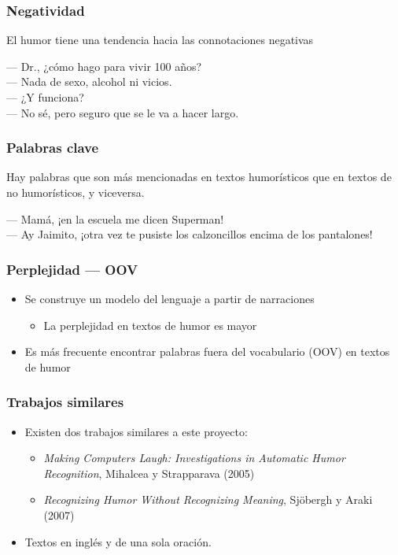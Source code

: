 \begin{frame}
    \frametitle{Negatividad}
    
    El humor tiene una tendencia hacia las connotaciones negativas

    \begin{example}
        --- Dr., ¿cómo hago para vivir 100 años? \\
        --- Nada de sexo, alcohol ni vicios. \\
        --- ¿Y funciona? \\
        --- No sé, pero seguro que se le va a hacer largo.
    \end{example}
\end{frame}

\begin{frame}
    \frametitle{Palabras clave}
    
    Hay palabras que son más mencionadas en textos humorísticos que en textos de no humorísticos, y viceversa.
    
    \begin{example}
        --- Mamá, ¡en la escuela me dicen Superman! \\
        --- Ay Jaimito, ¡otra vez te pusiste los calzoncillos encima de los pantalones!
    \end{example}
\end{frame}

\begin{frame}
    \frametitle{Perplejidad --- OOV}
    
    \begin{itemize}
        \item Se construye un modelo del lenguaje a partir de narraciones

        \begin{itemize}
            \item La perplejidad en textos de humor es mayor
        \end{itemize}

        \item Es más frecuente encontrar palabras fuera del vocabulario (OOV) en textos de humor
    \end{itemize}
\end{frame}

\begin{frame}
    \frametitle{Trabajos similares}

    \begin{itemize}
        \item Existen dos trabajos similares a este proyecto:

        \begin{itemize}
            \item \emph{Making Computers Laugh: Investigations in Automatic Humor Recognition}, Mihalcea y Strapparava (2005)
            \item \emph{Recognizing Humor Without Recognizing Meaning}, Sjöbergh y Araki (2007)
        \end{itemize}
        \item Textos en inglés y de una sola oración.
    \end{itemize}
\end{frame}

